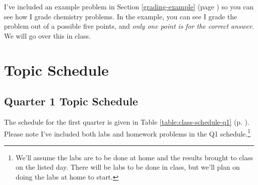 \documentclass[11pt, oneside]{article}   	%
\begin{document}
I've included an example problem in Section  \ref{grading-example}  (page \pageref{grading-example}) so you can see how I grade chemistry problems.
In the example, you can see I grade the problem out of a possible five points, and \emph{only one point is for the correct answer}.  We will go over this in class.


\section{Topic Schedule}
\subsection*{Quarter 1 Topic Schedule}
The schedule for the first quarter is given in Table \ref{table:class-schedule-q1} (p. \pageref{table:class-schedule-q1}).
Please note I've included both labs and homework problems in the Q1 schedule.\footnote{We'll assume the labs are to be done at home and the results brought to class on the listed day. There will be labs to be done in class, but we'll plan on doing the labs at home to start.}
\end{document}
